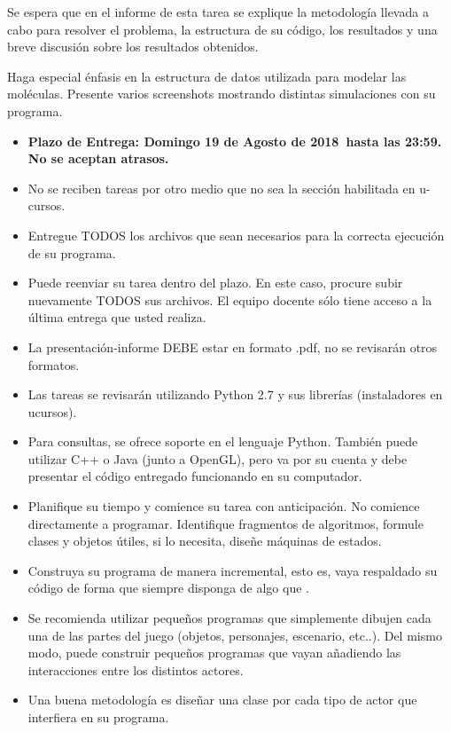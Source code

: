 \documentclass[letterpaper,11pt]{article} %
\def\plazoentrega {Domingo 19 de Agosto de 2018}
\begin{document}

Se espera que en el informe de esta tarea se explique la metodología llevada a cabo para resolver el problema, la estructura de su código, los resultados y una breve discusión sobre los resultados obtenidos. 

\newp Haga especial énfasis en la estructura de datos utilizada para modelar las moléculas. Presente varios screenshots mostrando distintas simulaciones con su programa.


\begin{itemize}
	\item \textbf{Plazo de Entrega: \plazoentrega \ hasta las 23:59. No se aceptan atrasos.}
	\item No se reciben tareas por otro medio que no sea la sección habilitada en u-cursos.
	\item Entregue TODOS los archivos que sean necesarios para la correcta ejecución de su programa.
	\item Puede reenviar su tarea dentro del plazo. En este caso, procure subir nuevamente TODOS sus archivos. El equipo docente sólo tiene acceso a la última entrega que usted realiza.
	\item La presentación-informe DEBE estar en formato .pdf, no se revisarán otros formatos.
	\item Las tareas se revisarán utilizando Python 2.7 y sus librerías (instaladores en ucursos).
	\item Para consultas, se ofrece soporte en el lenguaje Python. También puede utilizar C++ o Java (junto a OpenGL), pero va por su cuenta y debe presentar el código entregado funcionando en su computador.
\end{itemize}


\begin{itemize}
	\item Planifique su tiempo y comience su tarea con anticipación. No comience directamente a programar. Identifique fragmentos de algoritmos, formule clases y objetos útiles, si lo necesita, diseñe máquinas de estados.
	\item Construya su programa de manera incremental, esto es, vaya respaldado su código de forma que siempre disponga de algo que .
	\item Se recomienda utilizar pequeños programas que simplemente dibujen cada una de las partes del juego (objetos, personajes, escenario, etc..). Del mismo modo, puede construir pequeños programas que vayan añadiendo las interacciones entre los distintos actores.
	\item Una buena metodología es diseñar una clase por cada tipo de actor que interfiera en su programa.
\end{itemize}

\end{document}
